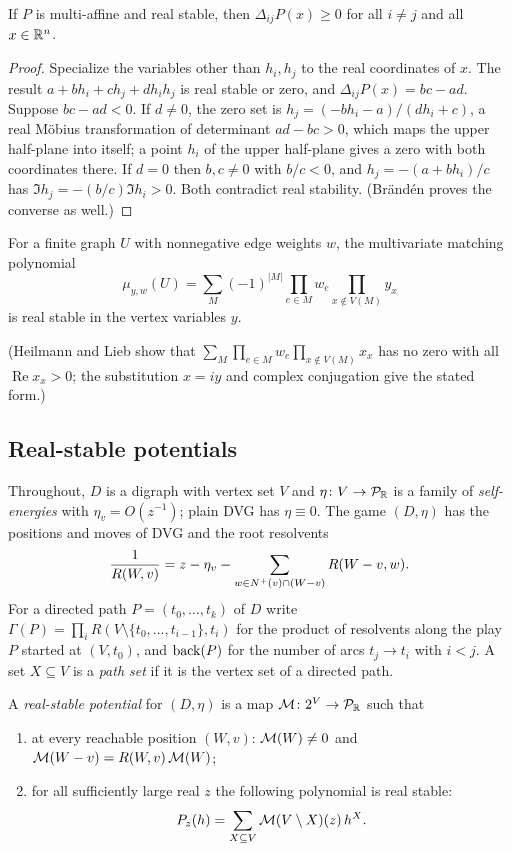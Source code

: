 \begin{lemma}\label{lem:branden}
If $P$ is multi-affine and real stable, then $\Delta_{ij}P(x)\ge0$ for all $i\ne j$ and all $x\in\RR^n$.
\end{lemma}
\begin{proof}
Specialize the variables other than $h_i,h_j$ to the real coordinates of $x$. The result $a+bh_i+ch_j+dh_ih_j$ is real stable or zero, and $\Delta_{ij}P(x)=bc-ad$. Suppose $bc-ad<0$. If $d\neq0$, the zero set is $h_j=(-bh_i-a)/(dh_i+c)$, a real M\"obius transformation of determinant $ad-bc>0$, which maps the upper half-plane into itself; a point $h_i$ of the upper half-plane gives a zero with both coordinates there. If $d=0$ then $b,c\ne0$ with $b/c<0$, and $h_j=-(a+bh_i)/c$ has $\Im h_j=-(b/c)\Im h_i>0$. Both contradict real stability. (Br\"and\'en proves the converse as well.)
\end{proof}

\begin{theorem}\label{thm:hl}
For a finite graph $U$ with nonnegative edge weights $w$, the multivariate matching polynomial
\[
\mu_{y,w}(U)=\sum_M(-1)^{|M|}\prod_{e\in M}w_e\prod_{x\notin V(M)}y_x
\]
is real stable in the vertex variables $y$.
\end{theorem}
\noindent(Heilmann and Lieb show that $\sum_M\prod_{e\in M}w_e\prod_{x\notin V(M)}x_x$ has no zero with all $\operatorname{Re}x_x>0$; the substitution $x=iy$ and complex conjugation give the stated form.)

\subsection{Real-stable potentials}
Throughout, $D$ is a digraph with vertex set $V$ and $\eta\colon V\to\Puis$ is a family of \emph{self-energies} with $\eta_v=O(z^{-1})$; plain DVG has $\eta\equiv0$. The game $(D,\eta)$ has the positions and moves of DVG and the root resolvents
\[
\frac1{R(W,v)}=z-\eta_v-\sum_{w\in\nplus(v)\cap(W-v)}R(W-v,w).
\]
For a directed path $P=(t_0,\dots,t_k)$ of $D$ write $\Gamma(P)=\prod_{i}R(V\setminus\{t_0,\dots,t_{i-1}\},t_i)$ for the product of resolvents along the play $P$ started at $(V,t_0)$, and $\back(P)$ for the number of arcs $t_j\to t_i$ with $i<j$. A set $X\subseteq V$ is a \emph{path set} if it is the vertex set of a directed path.

\begin{definition}\label{def:real-stable}
A \emph{real-stable potential} for $(D,\eta)$ is a map $\Mpot\colon2^V\to\Puis$ such that
\begin{enumerate}[label=\textup{(P\arabic*)}]
\item at every reachable position $(W,v)$: $\Mpot(W)\neq0$ and $\Mpot(W-v)=R(W,v)\,\Mpot(W)$;
\item for all sufficiently large real $z$ the following polynomial is real stable:
\[
P_z(h)=\sum_{X\subseteq V}\Mpot(V\setminus X)(z)\,h^X.
\]
\end{enumerate}
\end{definition}

